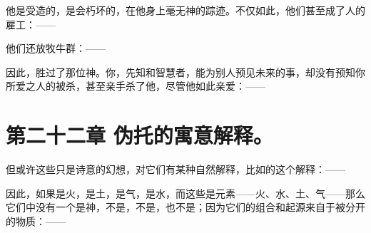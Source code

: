 他是受造的，是会朽坏的，在他身上毫无神的踪迹。不仅如此，他们甚至成了人的雇工：——\par

\par

他们还放牧牛群：——\par

\par

因此，胜过了那位神。你，先知和智慧者，能为别人预见未来的事，却没有预知你所爱之人的被杀，甚至亲手杀了他，尽管他如此亲爱：——\par

\par

\par

\par


\section{第二十二章 伪托的寓意解释。}

但或许这些只是诗意的幻想，对它们有某种自然解释，比如的这个解释：——\par

\par

因此，如果是火，是土，是气，是水，而这些是元素——火、水、土、气——那么它们中没有一个是神，不是，不是，也不是；因为它们的组合和起源来自于被分开的物质：——\par

